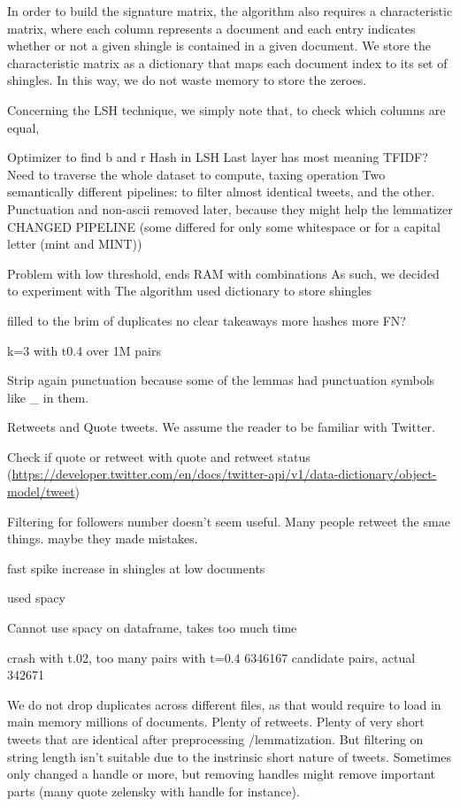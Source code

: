 \documentclass[runningheads]{llncs}
\begin{document}
In order to build the signature matrix, the algorithm also requires a characteristic matrix, where each column represents a document and each entry indicates whether or not a given shingle is contained in a given document. We store the characteristic matrix as a dictionary that maps each document index to its set of shingles. In this way, we do not waste memory to store the zeroes.

Concerning the LSH technique, we simply note that, to check which columns are equal, 

Optimizer to find b and r
Hash in LSH
Last layer has most meaning
TFIDF? Need to traverse the whole dataset to compute, taxing operation
Two semantically different pipelines: to filter almost identical tweets, and the other.
Punctuation and non-ascii removed later, because they might help the lemmatizer
CHANGED PIPELINE (some differed for only some whitespace or for a capital letter (mint and MINT))

Problem with low threshold, ends RAM with combinations
As such, we decided to experiment with   
The algorithm 
used dictionary to store shingles 

filled to the brim of duplicates
no clear takeaways
more hashes more FN?

k=3 with t0.4 over 1M pairs

Strip again punctuation because some of the lemmas had punctuation symbols like \_ in them.

Retweets and Quote tweets. We assume the reader to be familiar with Twitter.

Check if quote or retweet with quote and retweet status (\url{https://developer.twitter.com/en/docs/twitter-api/v1/data-dictionary/object-model/tweet})

Filtering for followers number doesn't seem useful. Many people retweet the smae things. maybe they made mistakes.

fast spike increase in shingles at low documents

used spacy 

Cannot use spacy on dataframe, takes too much time

crash with t.02, too many pairs
with t=0.4 6346167 candidate pairs, actual 342671 

We do not drop duplicates across different files, as that would require to load in main memory millions of documents. Plenty of retweets. Plenty of very short tweets that are identical after preprocessing /lemmatization. But filtering on string length isn't suitable due to the instrinsic short nature of tweets.  
Sometimes only changed a handle or more, but removing handles might remove important parts (many quote zelensky with handle for instance).
\end{document}
